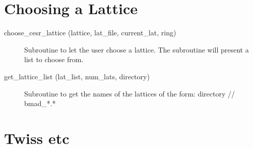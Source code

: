 \section{Choosing a Lattice}
\label{r:lat}

\begin{description}

\item[choose\_cesr\_lattice (lattice, lat\_file, current\_lat, ring)] \Newline
Subroutine to let the user choose a lattice. The subroutine will present a list to choose from. 

\item[get\_lattice\_list (lat\_list, num\_lats, directory)] \Newline
Subroutine to get the names of the lattices of the form: directory // bmad\_*.* 

\end{description}

\section{Twiss etc}
\label{r:twiss}

